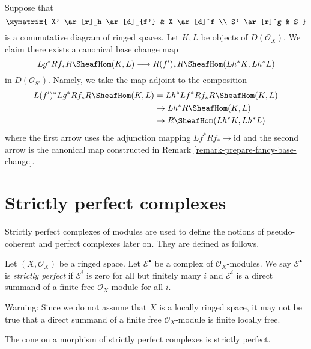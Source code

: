 \begin{remark}
\label{remark-fancy-base-change}
Suppose that
$$
\xymatrix{
X' \ar[r]_h \ar[d]_{f'} &
X \ar[d]^f \\
S' \ar[r]^g &
S
}
$$
is a commutative diagram of ringed spaces. Let $K, L$ be objects
of $D(\mathcal{O}_X)$. We claim there exists a canonical base change
map
$$
Lg^*Rf_*R\SheafHom(K, L)
\longrightarrow
R(f')_*R\SheafHom(Lh^*K, Lh^*L)
$$
in $D(\mathcal{O}_{S'})$. Namely, we take the map adjoint to
the composition
\begin{align*}
L(f')^*Lg^*Rf_*R\SheafHom(K, L)
& =
Lh^*Lf^*Rf_*R\SheafHom(K, L) \\
& \to
Lh^*R\SheafHom(K, L) \\
& \to
R\SheafHom(Lh^*K, Lh^*L)
\end{align*}
where the first arrow uses the adjunction mapping
$Lf^*Rf_* \to \text{id}$ and the second arrow is the canonical map
constructed in Remark \ref{remark-prepare-fancy-base-change}.
\end{remark}








\section{Strictly perfect complexes}
\label{section-strictly-perfect}

\noindent
Strictly perfect complexes of modules are used to define the notions
of pseudo-coherent and perfect complexes later on. They are defined
as follows.

\begin{definition}
\label{definition-strictly-perfect}
Let $(X, \mathcal{O}_X)$ be a ringed space.
Let $\mathcal{E}^\bullet$ be a complex of $\mathcal{O}_X$-modules.
We say $\mathcal{E}^\bullet$ is {\it strictly perfect}
if $\mathcal{E}^i$ is zero for all but finitely many $i$ and
$\mathcal{E}^i$ is a direct summand of a finite free
$\mathcal{O}_X$-module for all $i$.
\end{definition}

\noindent
Warning: Since we do not assume that $X$ is a locally ringed space,
it may not be true that a direct summand of a finite free
$\mathcal{O}_X$-module is finite locally free.

\begin{lemma}
\label{lemma-cone}
The cone on a morphism of strictly perfect complexes is
strictly perfect.
\end{lemma}

